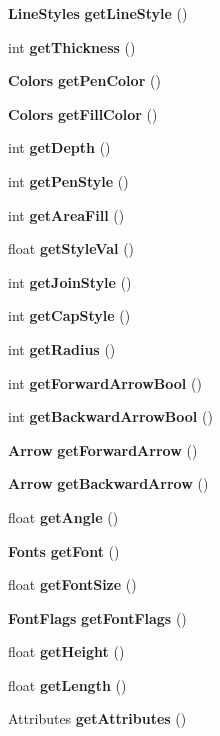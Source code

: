 \begin{CompactItemize}
\item 
{\bf Line\-Styles} {\bf get\-Line\-Style} ()
\item 
int {\bf get\-Thickness} ()
\item 
{\bf Colors} {\bf get\-Pen\-Color} ()
\item 
{\bf Colors} {\bf get\-Fill\-Color} ()
\item 
int {\bf get\-Depth} ()
\item 
int {\bf get\-Pen\-Style} ()
\item 
int {\bf get\-Area\-Fill} ()
\item 
float {\bf get\-Style\-Val} ()
\item 
int {\bf get\-Join\-Style} ()
\item 
int {\bf get\-Cap\-Style} ()
\item 
int {\bf get\-Radius} ()
\item 
int {\bf get\-Forward\-Arrow\-Bool} ()
\item 
int {\bf get\-Backward\-Arrow\-Bool} ()
\item 
{\bf Arrow} {\bf get\-Forward\-Arrow} ()
\item 
{\bf Arrow} {\bf get\-Backward\-Arrow} ()
\item 
float {\bf get\-Angle} ()
\item 
{\bf Fonts} {\bf get\-Font} ()
\item 
float {\bf get\-Font\-Size} ()
\item 
{\bf Font\-Flags} {\bf get\-Font\-Flags} ()
\item 
float {\bf get\-Height} ()
\item 
float {\bf get\-Length} ()
\item 
Attributes {\bf get\-Attributes} ()
\end{CompactItemize}
